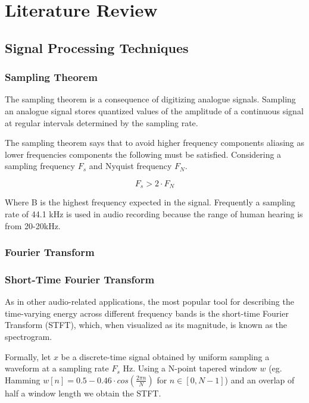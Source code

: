 
\chapter{Literature Review}
\label{ch:review}
\vspace{2em}

\section{Signal Processing Techniques}
\subsection{Sampling Theorem}

The sampling theorem is a consequence of digitizing analogue signals. Sampling an analogue signal stores quantized values of the amplitude of a continuous signal at regular intervals determined by the sampling rate. 

The sampling theorem says that to avoid higher frequency components aliasing as lower frequencies components the following must be satisfied. Considering a sampling frequency $F_{s}$ and Nyquist frequency $F_{N}$. 

\begin{equation}
    F_{s} > 2\cdot F_{N}     
\end{equation}

Where B is the highest frequency expected in the signal. Frequently a sampling rate of 44.1 kHz is used in audio recording because the range of human hearing is from 20-20kHz.  


\subsection{Fourier Transform}
\subsection{Short-Time Fourier Transform}

As in other audio-related applications, the most popular tool for describing the time-varying energy across different frequency bands is the short-time Fourier Transform (STFT), which, when visualized as its magnitude, is known as the spectrogram. 

Formally, let $x$ be a discrete-time signal obtained by uniform sampling a waveform at a sampling rate $F_{s}$ Hz. Using a N-point tapered window $w$ (eg. Hamming $w[n] = 0.5-0.46\cdot cos(\frac{2\pi n}{N})$ for $n\in\left[0,N-1\right]$) and an overlap of half a window length we obtain the STFT. 

